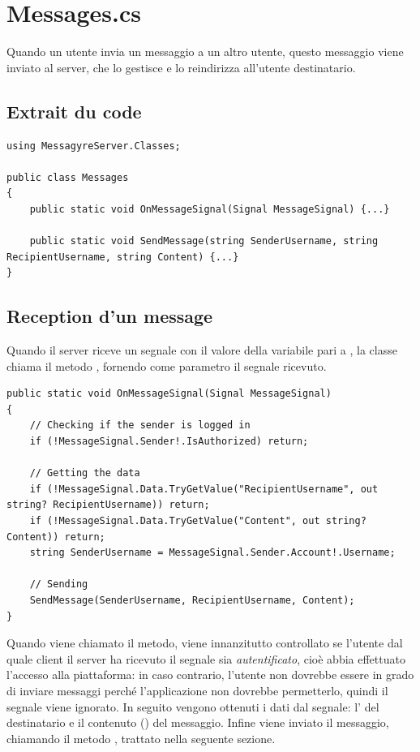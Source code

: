 \documentclass[12pt]{report}
\begin{document}
\section{Messages.cs}

Quando un utente invia un messaggio a un altro utente, questo messaggio viene inviato al server, che lo gestisce e lo reindirizza all'utente destinatario.

\subsection{Extrait du code}

\begin{verbatim}
using MessagyreServer.Classes;

public class Messages
{
	public static void OnMessageSignal(Signal MessageSignal) {...}
	
	public static void SendMessage(string SenderUsername, string RecipientUsername, string Content) {...}
}
\end{verbatim}

\subsection{Reception d'un message}

Quando il server riceve un segnale con il valore della variabile  pari a , la classe  chiama il metodo , fornendo come parametro il segnale ricevuto.

\begin{verbatim}
public static void OnMessageSignal(Signal MessageSignal)
{
	// Checking if the sender is logged in
	if (!MessageSignal.Sender!.IsAuthorized) return;
	
	// Getting the data
	if (!MessageSignal.Data.TryGetValue("RecipientUsername", out string? RecipientUsername)) return;
	if (!MessageSignal.Data.TryGetValue("Content", out string? Content)) return;
	string SenderUsername = MessageSignal.Sender.Account!.Username;
	
	// Sending
	SendMessage(SenderUsername, RecipientUsername, Content);
}
\end{verbatim}

Quando viene chiamato il metodo, viene innanzitutto controllato se l'utente dal quale client il server ha ricevuto il segnale sia \textit{autentificato}, cioè abbia effettuato l'accesso alla piattaforma: in caso contrario, l'utente non dovrebbe essere in grado di inviare messaggi perché l'applicazione non dovrebbe permetterlo, quindi il segnale viene ignorato.
In seguito vengono ottenuti i dati dal segnale: l' del destinatario e il contenuto () del messaggio. 
Infine viene inviato il messaggio, chiamando il metodo , trattato nella seguente sezione.
\end{document}

